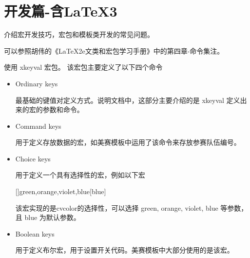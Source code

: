 %
%
%
%


\section{开发篇-含LaTeX3}

介绍宏开发技巧，宏包和模板类开发的常见问题。



可以参照胡伟的《LaTeX2e文类和宏包学习手册》中的第四章-命令集注。



使用 xkeyval 宏包。
该宏包主要定义了以下四个命令
\begin{itemize}
  \item Ordinary keys

    最基础的键值对定义方式。说明文档中，这部分主要介绍的是 xkeyval 定义出来的宏的参数和命令。

  \item Command keys

    用于定义存放数据的宏，如美赛模板中运用了该命令来存放参赛队伍编号。

  \item Choice keys

    用于定义一个具有选择性的宏，例如以下宏
\begin{texcode}
  [\val\ar]{green,orange,violet,blue}[blue]{
    \ifcase\ar\relax
    \or
    \or
    \else
    \fi
  }
\end{texcode}
  该宏实现的是cvcolor的选择性，可以选择 green, orange, violet, blue 等参数，且 blue 为默认参数。

  \item Boolean keys

    用于定义布尔宏，用于设置开关代码。美赛模板中大部分使用的是该宏。
\end{itemize}

